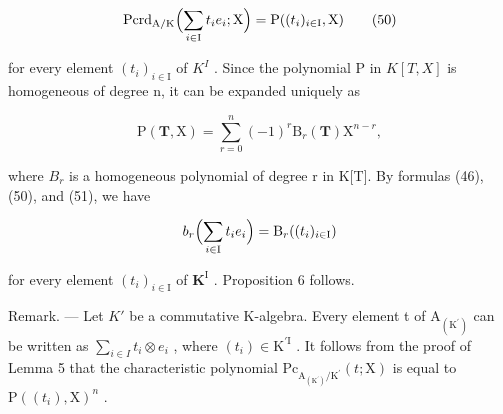 \[
\mathrm{Pcrd} _ {\mathrm{A/K}} \Bigl (\sum_ {i \in \mathrm{I}} t _ {i} e _ {i}; \mathrm{X} \Bigr) = \mathrm{P} ((t _ {i}) _ {i \in \mathrm{I}}, \mathrm{X})\tag{50}
\]

for every element \((t_{i})_{i\in\mathrm{I}}\) of \(K^{I}\) . Since the polynomial P in \(K[T,X]\) is homogeneous of degree n, it can be expanded uniquely as

\[
\mathrm{P} (\mathbf {T}, \mathrm{X}) = \sum_ {r = 0} ^ {n} (- 1) ^ {r} \mathrm{B} _ {r} (\mathbf {T}) \mathrm{X} ^ {n - r},\tag{51}
\]

where \(B_{r}\) is a homogeneous polynomial of degree r in K{[}T{]}. By formulas (46), (50), and (51), we have

\[
b _ {r} \Bigl (\sum_ {i \in \mathrm{I}} t _ {i} e _ {i} \Bigr) = \mathrm{B} _ {r} ((t _ {i}) _ {i \in \mathrm{I}})
\]

for every element \((t_i)_{i\in \mathrm{I}}\) of \(\mathbf{K}^{\mathrm{I}}\) . Proposition 6 follows.

Remark. --- Let \(K'\) be a commutative K-algebra. Every element t of \(\mathrm{A}_{(\mathrm{K}^{\prime})}\) can be written as \(\sum_{i\in I}t_{i}\otimes e_{i}\) , where \((t_{i})\in\mathrm{K}^{\prime\mathrm{I}}\) . It follows from the proof of Lemma 5 that the characteristic polynomial \(\mathrm{Pc}_{\mathrm{A}_{(\mathrm{K}^{\prime})}/\mathrm{K}^{\prime}}(t;\mathrm{X})\) is equal to \(\mathrm{P}((t_{i}),\mathrm{X})^{n}\) .
